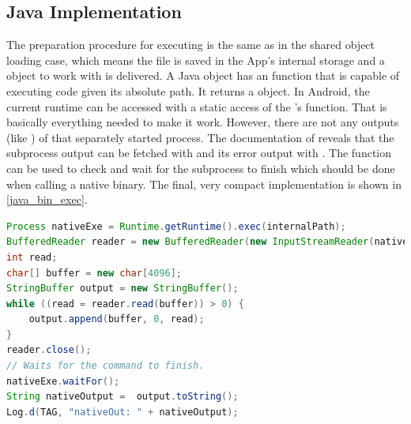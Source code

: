 \subsection{Java Implementation}\label{dyn_bin_java}
The preparation procedure for executing is the same as in the shared object loading
case, which means the file is saved in the App's internal storage and a  object to work with is delivered. A Java  object has an  function that is capable of executing code given its absolute path. It returns a 
object. In Android, the current runtime can be accessed with a static access of the
's  function.
That is basically everything needed to make it work. However, there are not any
outputs (like ) of that separately started process.
The documentation of  reveals that the subprocess output can be
fetched with  and its error output with .
The  function can be used to check and wait for the subprocess to finish which should be done when calling a native binary.
The final, very compact implementation is shown in \autoref{java_bin_exec}.
\begin{lstlisting}[language=Java, caption=Java Native Exec(), label=java_bin_exec]
Process nativeExe = Runtime.getRuntime().exec(internalPath);
BufferedReader reader = new BufferedReader(new InputStreamReader(nativeExe.getInputStream()));
int read;
char[] buffer = new char[4096];
StringBuffer output = new StringBuffer();
while ((read = reader.read(buffer)) > 0) {
    output.append(buffer, 0, read);
}
reader.close();
// Waits for the command to finish.
nativeExe.waitFor();
String nativeOutput =  output.toString();
Log.d(TAG, "nativeOut: " + nativeOutput);
\end{lstlisting}

